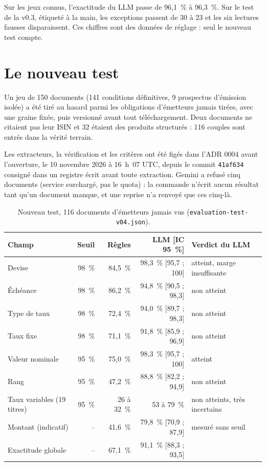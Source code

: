 \documentclass[11pt,a4paper]{article}
\begin{document}
Sur les jeux connus, l'exactitude du LLM passe de 96,1~\% à 96,3~\%. Sur le test de la v0.3, étiqueté à la main, les exceptions passent de 30 à 23 et les six lectures fausses disparaissent. Ces chiffres sont des données de réglage : seul le nouveau test compte.

\section{Le nouveau test}

Un jeu de 150 documents (141 conditions définitives, 9 prospectus d'émission isolée) a été tiré au hasard parmi les obligations d'émetteurs jamais tirées, avec une graine fixée, puis versionné avant tout téléchargement. Deux documents ne citaient pas leur ISIN et 32 étaient des produits structurés : 116 couples sont entrés dans la vérité terrain.

Les extracteurs, la vérification et les critères ont été figés dans l'ADR 0004 avant l'ouverture, le 10 novembre 2026 à 16~h~07 UTC, depuis le commit \texttt{41af634} consigné dans un registre écrit avant toute extraction. Gemini a refusé cinq documents (service surchargé, pas le quota) : la commande n'écrit aucun résultat tant qu'un document manque, et une reprise n'a renvoyé que ces cinq-là.

\begin{table}[H]
\small
\begin{tabularx}{\linewidth}{Yrrrl}
\toprule
\textbf{Champ} & \textbf{Seuil} & \textbf{Règles} & \textbf{LLM [IC 95~\%]} & \textbf{Verdict du LLM} \\
\midrule
Devise & 98~\% & 84,5~\% & 98,3~\% [95,7 ; 100] & atteint, marge insuffisante \\
Échéance & 98~\% & 86,2~\% & 94,8~\% [90,5 ; 98,3] & non atteint \\
Type de taux & 98~\% & 72,4~\% & 94,0~\% [89,7 ; 98,3] & non atteint \\
Taux fixe & 98~\% & 71,1~\% & 91,8~\% [85,9 ; 96,9] & non atteint \\
Valeur nominale & 95~\% & 75,0~\% & 98,3~\% [95,7 ; 100] & atteint \\
Rang & 95~\% & 47,2~\% & 88,8~\% [82,2 ; 94,9] & non atteint \\
Taux variables (19 titres) & 95~\% & 26 à 32~\% & 53 à 79~\% & non atteints, très incertains \\
Montant (indicatif) & -- & 41,6~\% & 79,8~\% [70,9 ; 87,9] & mesuré sans seuil \\
\midrule
Exactitude globale & -- & 67,1~\% & 91,1~\% [88,3 ; 93,5] & \\
\bottomrule
\end{tabularx}
\caption{Nouveau test, 116 documents d'émetteurs jamais vus (\texttt{evaluation-test-v04.json}).}
\end{table}
\end{document}
